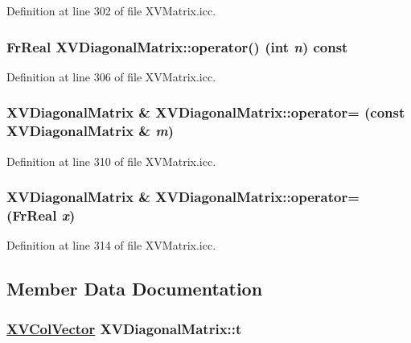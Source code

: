 Definition at line 302 of file XVMatrix.icc.\label{XVDiagonalMatrix_a7}
\hypertarget{class_XVDiagonalMatrix_a7}{
\subsubsection[operator()]{\setlength{\rightskip}{0pt plus 5cm}Fr\-Real XVDiagonal\-Matrix::operator() (int {\em n}) const}}




Definition at line 306 of file XVMatrix.icc.\label{XVDiagonalMatrix_a8}
\hypertarget{class_XVDiagonalMatrix_a8}{
\subsubsection[operator=]{\setlength{\rightskip}{0pt plus 5cm}XVDiagonal\-Matrix \& XVDiagonal\-Matrix::operator= (const XVDiagonal\-Matrix \& {\em m})}}




Definition at line 310 of file XVMatrix.icc.\label{XVDiagonalMatrix_a9}
\hypertarget{class_XVDiagonalMatrix_a9}{
\subsubsection[operator=]{\setlength{\rightskip}{0pt plus 5cm}XVDiagonal\-Matrix \& XVDiagonal\-Matrix::operator= (Fr\-Real {\em x})}}




Definition at line 314 of file XVMatrix.icc.

\subsection{Member Data Documentation}
\label{XVDiagonalMatrix_o0}
\hypertarget{class_XVDiagonalMatrix_o0}{
\subsubsection[t]{\setlength{\rightskip}{0pt plus 5cm}\hyperlink{class_XVColVector}{XVCol\-Vector} XVDiagonal\-Matrix::t}}





